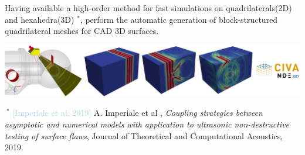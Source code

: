 \documentclass[a0paper,portrait, fontscale=0.30]{baposter}
\begin{document}
\begin{poster}
{\begin{minipage}[b]{0.3\linewidth}
Having available a high-order method for fast simulations on quadrilaterals(2D) and hexahedra(3D) $^{*}$,
perform the automatic generation of block-structured quadrilateral
meshes for CAD 3D surfaces.
\end{minipage}
\begin{minipage}[b]{0.7\linewidth}
\includegraphics[width=\textwidth]{civa_img_new}%
\end{minipage}
\footnotesize
 $~^*$ \textcolor{lightblue}{[Imperiale et al. 2019]} A. Imperiale et al , \textit{Coupling strategies between asymptotic and numerical models with application to ultrasonic non-destructive testing of surface flaws}, Journal of Theoretical and Computational Acoustics, 2019.
}
\end{poster}
\end{document}
